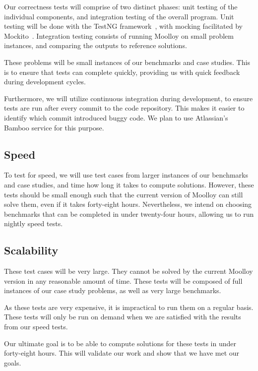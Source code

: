\documentclass[11pt]{article}
\begin{document}
Our correctness tests will comprise of two distinct phases: unit
testing of the individual components, and integration testing of the
overall program. Unit testing will be done with the TestNG
framework~\cite{ref:testng}, with mocking facilitated by
Mockito~\cite{ref:mockito}. Integration testing consists of running
Moolloy on small problem instances, and comparing the outputs to
reference solutions.

These problems will be small instances of our benchmarks and case
studies. This is to ensure that tests can complete quickly, providing
us with quick feedback during development cycles.

Furthermore, we will utilize continuous integration during development,
to ensure tests are run after every commit to the code repository. This
makes it easier to identify which commit introduced buggy code. We plan
to use Atlassian's Bamboo service for this purpose.

\subsection{Speed}\label{sec:speed}

To test for speed, we will use test cases from larger instances of our
benchmarks and case studies, and time how long it takes to compute
solutions. However, these tests should be small enough such that the
current version of Moolloy can still solve them, even if it takes
forty-eight hours. Nevertheless, we intend on choosing benchmarks that
can be completed in under twenty-four hours, allowing us to run nightly
speed tests.

\subsection{Scalability}\label{sec:scalability}

These test cases will be very large. They cannot be solved by the
current Moolloy version in any reasonable amount of time. These tests
will be composed of full instances of our case study problems, as well
as very large benchmarks.

As these tests are very expensive, it is impractical to run them on a
regular basis. These tests will only be run on demand when we are
satisfied with the results from our speed tests.

Our ultimate goal is to be able to compute solutions for these tests in
under forty-eight hours. This will validate our work and show that we
have met our goals.
\end{document}
